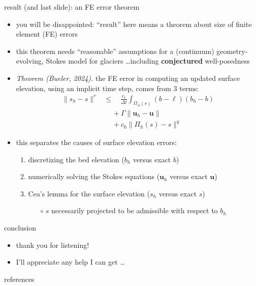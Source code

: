 \documentclass[10pt,dvipsnames]{beamer}
\newcommand{\bu}{\mathbf{u}}
\begin{document}
\begin{frame}{result (and last slide): an FE error theorem}

\begin{itemize}
\item you will be disappointed: ``result'' here means a theorem about size of finite element (FE) errors
\item this theorem needs ``reasonable'' assumptions for a (continuum) geometry- evolving, Stokes model for glaciers \dots including \textbf{conjectured} well-posedness
\item \emph{Theorem (Bueler, 2024).}  the FE error in computing an updated surface elevation, using an implicit time step, comes from 3 terms:
\begin{align*}
\|s_h-s\|^r &\le \quad \frac{c_1}{\Delta t} \int_{\Omega_A(s)} (b - \ell) (b_h - b) \\
   &\quad\, + \Gamma \big\|\bu_h - \bu\big\| \\
   &\quad\, + c_0 \|\Pi_h(s) - s\|^q
\end{align*}
\item this separates the causes of surface elevation errors:
    \begin{enumerate}
    \item discretizing the bed elevation ($b_h$ versus exact $b$)
    \item numerically solving the Stokes equations ($\bu_h$ versus exact $\bu$)
    \item Cea's lemma for the surface elevation ($s_h$ versus exact $s$) \strut
        \begin{itemize}
        \item[$\circ$] $s$ necessarily projected to be admissible with respect to $b_h$
        \end{itemize}
    \end{enumerate}
\end{itemize}
\end{frame}


\begin{frame}{conclusion}

\begin{itemize}
\item thank you for listening!
\item I'll appreciate any help I can get \dots
\end{itemize}
\end{frame}


\begin{frame}{references}

{\footnotesize }
\end{frame}
\end{document}
